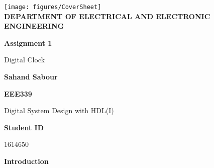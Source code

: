 \documentclass[12pt,a4paper]{article}
\begin{document}
	\begin{titlepage}
		\begin{center}
			\texttt{[image: figures/CoverSheet]}\\
			\bf{ \small{DEPARTMENT OF ELECTRICAL AND ELECTRONIC ENGINEERING} }
		\end{center}
		
		\vspace{4cm}
		\centering
		\textbf{\Huge Assignment 1}
		
		\vspace{1cm}
		
		{\Large Digital Clock}
		
		\vspace{4cm}
		
		\textbf{\LARGE Sahand Sabour}
		
		\vspace{2cm}
		
		\textbf{\large EEE339}
		
		\vspace{0.5cm}
		
		{\large Digital System Design with HDL(I)}
		
		\vspace{1.5cm}
		
		\textbf{\large Student ID}
		
		\vspace{0.5cm}
		
		{\large 1614650}
		
		\vfill
		
	\end{titlepage}
	
	\noindent \textbf{\Large Introduction}
	\vspace{0.2cm}
	
\end{document}
